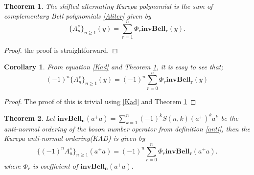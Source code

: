 \documentclass[pdflatex,sn-mathphys-num]{sn-jnl}%
\newtheorem{theorem}{Theorem}
\newtheorem{corollary}{Corollary}
\theoremstyle{thmstyleone}%
\theoremstyle{thmstyletwo}%
\theoremstyle{thmstylethree}%
\begin{document}
\begin{theorem}\label{altk}
The shifted alternating Kurepa polynomial is the sum of complementary Bell polynomials \ref{Aliter} given by
$$\lbrace A_n^s\rbrace_{n\geq 1}(y)=\sum_{r=1}^{n} \Phi_r \mathbf{invBell_r}(y).$$    
\end{theorem}
\begin{proof}
    the proof is straightforward.
\end{proof}

\begin{corollary} From equation \ref{Kad} and Theorem \ref{altk}, it is easy to see that;
    $$(-1)^n\lbrace A_n^s\rbrace_{n\geq 1}(y)=(-1)^n\sum_{r=0}^{n} \Phi_r \mathbf{invBell_r}(y)$$   
\end{corollary}
\begin{proof}
    The proof of this is trivial using \ref{Kad} and Theorem \ref{altk}
\end{proof}


\begin{theorem}
    Let $\mathbf{invBell_n}(a^{\mathbb{+}}a)=\sum_{k = 1}^{n} (-1)^k S(n, k) (a^{\mathbb{+}})^k a^k$ be the anti-normal ordering of the boson number operator from definition \ref{anti}, then the Kurepa anti-normal ordering(KAD) is given by 
    $$\lbrace (-1)^n A_n^s\rbrace_{n\geq 1}(a^{\mathbb{+}}a)=(-1)^n\sum_{r=0}^{n} \Phi_r \mathbf{invBell_r}(a^{\mathbb{+}}a). $$
   where $\Phi_r$ is coefficient of $\mathbf{invBell_n}(a^{\mathbb{+}}a).$
\end{theorem}
\end{document}
